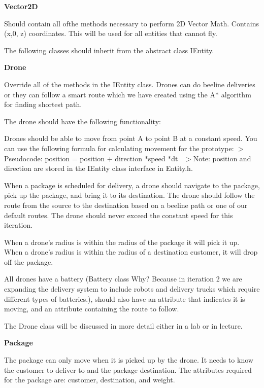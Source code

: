 {\bfseries Vector2D}

Should contain all ofthe methods necessary to perform 2D Vector Math. Contains (x,0, z) coordinates. This will be used for all entities that cannot fly.

The following classes should inherit from the abstract class I\+Entity.

{\bfseries Drone}

Override all of the methods in the I\+Entity class. Drones can do beeline deliveries or they can follow a smart route which we have created using the A$\ast$ algorithm for finding shortest path.

The drone should have the following functionality\+:


\begin{DoxyEnumerate}
\item Drones should be able to move from point A to point B at a constant speed. You can use the following formula for calculating movement for the prototype\+: $>$Pseudocode\+: position = position + direction $\ast$speed $\ast$dt~\newline
 $>$Note\+: position and direction are stored in the I\+Entity class interface in Entity.\+h.
\item When a package is scheduled for delivery, a drone should navigate to the package, pick up the package, and bring it to its destination. The drone should follow the route from the source to the destination based on a beeline path or one of our default routes. The drone should never exceed the constant speed for this iteration.
\item When a drone’s radius is within the radius of the package it will pick it up. When a drone’s radius is within the radius of a destination customer, it will drop off the package.
\end{DoxyEnumerate}

All drones have a battery (Battery class Why? Because in iteration 2 we are expanding the delivery system to include robots and delivery trucks which require different types of batteries.), should also have an attribute that indicates it is moving, and an attribute containing the route to follow.

The Drone class will be discussed in more detail either in a lab or in lecture.

{\bfseries Package}

The package can only move when it is picked up by the drone. It needs to know the customer to deliver to and the package destination. The attributes required for the package are\+: customer, destination, and weight.

